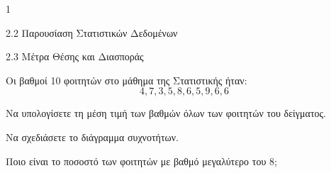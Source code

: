 \begin{ylh}{1}
	\item 2.2 Παρουσίαση Στατιστικών Δεδομένων
	\item 2.3 Μέτρα Θέσης και Διασποράς
\end{ylh}
Οι βαθμοί 10 φοιτητών στο μάθημα της Στατιστικής ήταν:
\[ 4,7,3,5,8,6,5,9,6,6 \]
\begin{alist}
	\item Να υπολογίσετε τη μέση τιμή των βαθμών όλων των φοιτητών του δείγματος. 
	\item Να σχεδιάσετε το διάγραμμα συχνοτήτων. 
	\item Ποιο είναι το ποσοστό των φοιτητών με βαθμό μεγαλύτερο του 8; 
\end{alist}

